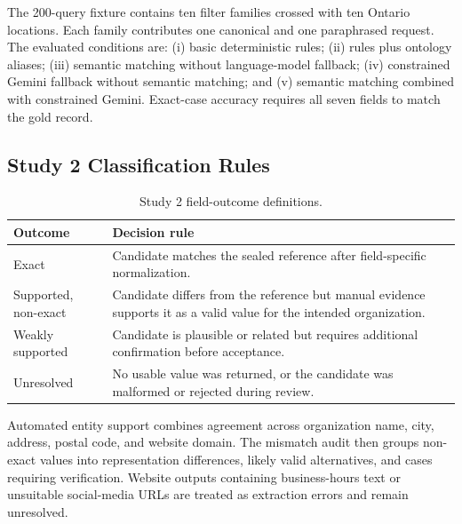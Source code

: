 \documentclass[journal,article,submit,moreauthors]{Definitions/mdpi}
\begin{document}
The 200-query fixture contains ten filter families crossed with ten Ontario locations. Each family contributes one canonical and one paraphrased request. The evaluated conditions are: (i) basic deterministic rules; (ii) rules plus ontology aliases; (iii) semantic matching without language-model fallback; (iv) constrained Gemini fallback without semantic matching; and (v) semantic matching combined with constrained Gemini. Exact-case accuracy requires all seven fields to match the gold record.

\subsection{Study 2 Classification Rules}
\begin{table}[H]
\caption{Study 2 field-outcome definitions.}
\label{tab:appendix_study2_outcomes}
\small
\begin{tabularx}{\textwidth}{@{}p{3.0cm}X@{}}
\toprule
\textbf{Outcome} & \textbf{Decision rule} \\
\midrule
Exact & Candidate matches the sealed reference after field-specific normalization. \\
Supported, non-exact & Candidate differs from the reference but manual evidence supports it as a valid value for the intended organization. \\
Weakly supported & Candidate is plausible or related but requires additional confirmation before acceptance. \\
Unresolved & No usable value was returned, or the candidate was malformed or rejected during review. \\
\bottomrule
\end{tabularx}
\end{table}

Automated entity support combines agreement across organization name, city, address, postal code, and website domain. The mismatch audit then groups non-exact values into representation differences, likely valid alternatives, and cases requiring verification. Website outputs containing business-hours text or unsuitable social-media URLs are treated as extraction errors and remain unresolved.

\iffalse
{} %
\appendixstart
\appendix
\section[\appendixname~\thesection]{}
\end{document}
